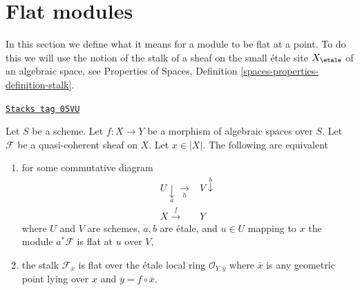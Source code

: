 \section{Flat modules}
\label{spaces-morphisms-section-flat-modules}
In this section we define what it means for a module to be flat at
a point. To do this we will use the notion of the stalk of a sheaf on
the small \'etale site $X_\etale$ of an algebraic space, see
Properties of Spaces, Definition \ref{spaces-properties-definition-stalk}.

\begin{lemma}
\label{spaces-morphisms-lemma-flat-at-point}
\href{https://stacks.math.columbia.edu/tag/05VU}{\texttt{Stacks tag 05VU}}

Let $S$ be a scheme. Let $f : X \to Y$ be a morphism of algebraic
spaces over $S$. Let $\mathcal{F}$ be a quasi-coherent sheaf on $X$.
Let $x \in |X|$. The following are equivalent
\begin{enumerate}
\item for some commutative diagram
$$
\begin{array}{cc}U \underset{a}{\downarrow}\underset{h}{\longrightarrow} & V \overset{b}{\downarrow} \\ X \overset{f}{\longrightarrow} & Y\end{array}
$$
where $U$ and $V$ are schemes, $a, b$ are \'etale, and
$u \in U$ mapping to $x$ the module $a^*\mathcal{F}$ is flat at $u$ over $V$,
\item the stalk $\mathcal{F}_{\overline{x}}$ is flat over
the \'etale local ring $\mathcal{O}_{Y, \overline{y}}$
where $\overline{x}$ is any geometric point lying over
$x$ and $\overline{y} = f \circ \overline{x}$.
\end{enumerate}
\end{lemma}


